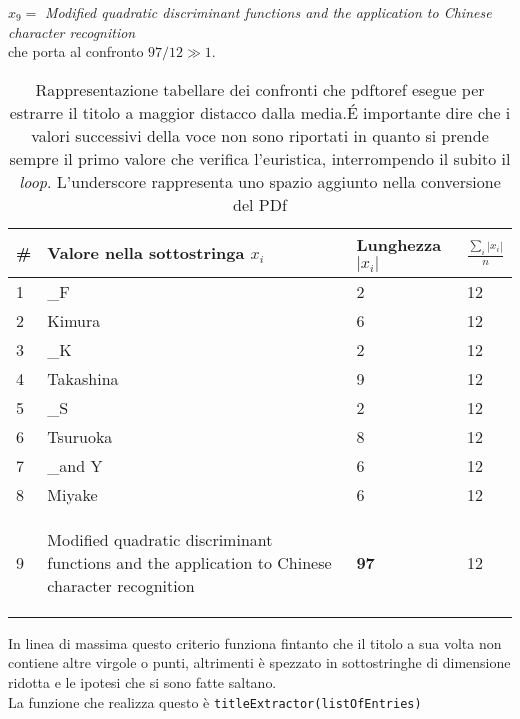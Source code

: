 $ x_9= $ \textit{Modified quadratic discriminant functions and the application to Chinese character recognition}\\

che porta al confronto $97/12 \gg 1$.

\begin{table}\label{tab:title}
\begin{center}
\begin{tabular}{|l|l|l|l|} \hline
	\#  & Valore nella sottostringa $x_i$ & Lunghezza $|x_i|$ & $  \frac{\sum_i |x_i|}{n}$  \\ \hline
	1 & \_F & 2 & 12 \\  
	2 & Kimura & 6 & 12 \\ 
	3 & \_K & 2 & 12 \\ 
	4 & Takashina & 9 & 12 \\
	5 & \_S & 2 & 12 \\
	6 & Tsuruoka & 8 & 12 \\
	7 & \_and Y & 6 & 12 \\
	8 & Miyake & 6 & 12 \\ 
	9 & \begin{scriptsize}Modified quadratic discriminant functions and the  application to Chinese character recognition\end{scriptsize} & \textbf{97} & 12 \\ \hline
\end{tabular}
\caption{Rappresentazione tabellare dei confronti che pdftoref esegue per estrarre il titolo a maggior distacco dalla media.\'E importante dire che i valori successivi della voce non sono riportati in quanto si prende sempre il primo valore che verifica l'euristica, interrompendo il subito il \textit{loop}. L'underscore rappresenta uno spazio aggiunto nella conversione del PDf}
\label{label}
\end{center}
\end{table}








In linea di massima questo criterio funziona fintanto che il titolo a sua volta non contiene altre virgole o punti, altrimenti è spezzato in sottostringhe di dimensione ridotta e le ipotesi che si sono fatte saltano. \\ La funzione che realizza questo è \texttt{titleExtractor(listOfEntries)}


